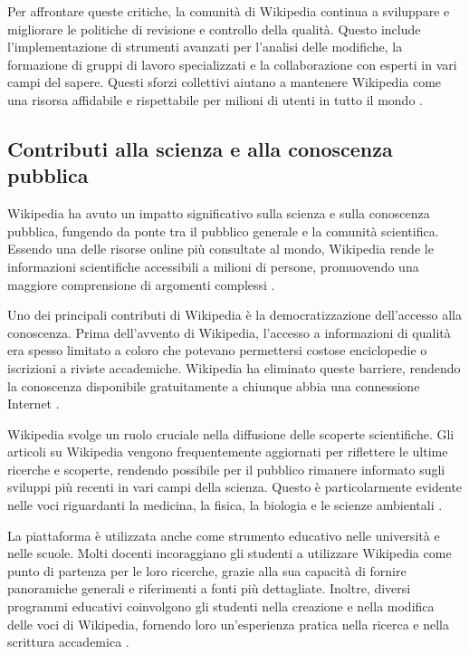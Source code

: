 \documentclass[12pt,a4paper]{report}
\begin{document}
Per affrontare queste critiche, la comunità di Wikipedia continua a sviluppare e migliorare le politiche di revisione e controllo della qualità. Questo include l'implementazione di strumenti avanzati per l'analisi delle modifiche, la formazione di gruppi di lavoro specializzati e la collaborazione con esperti in vari campi del sapere. Questi sforzi collettivi aiutano a mantenere Wikipedia come una risorsa affidabile e rispettabile per milioni di utenti in tutto il mondo \cite{jemielniak2014wikipedia}.

\subsection{Contributi alla scienza e alla conoscenza pubblica}

Wikipedia ha avuto un impatto significativo sulla scienza e sulla conoscenza pubblica, fungendo da ponte tra il pubblico generale e la comunità scientifica. Essendo una delle risorse online più consultate al mondo, Wikipedia rende le informazioni scientifiche accessibili a milioni di persone, promuovendo una maggiore comprensione di argomenti complessi \cite{reagle2010good}.

Uno dei principali contributi di Wikipedia è la democratizzazione dell'accesso alla conoscenza. Prima dell'avvento di Wikipedia, l'accesso a informazioni di qualità era spesso limitato a coloro che potevano permettersi costose enciclopedie o iscrizioni a riviste accademiche. Wikipedia ha eliminato queste barriere, rendendo la conoscenza disponibile gratuitamente a chiunque abbia una connessione Internet \cite{lih2009wikipedia}.

Wikipedia svolge un ruolo cruciale nella diffusione delle scoperte scientifiche. Gli articoli su Wikipedia vengono frequentemente aggiornati per riflettere le ultime ricerche e scoperte, rendendo possibile per il pubblico rimanere informato sugli sviluppi più recenti in vari campi della scienza. Questo è particolarmente evidente nelle voci riguardanti la medicina, la fisica, la biologia e le scienze ambientali \cite{jemielniak2014wikipedia}.

La piattaforma è utilizzata anche come strumento educativo nelle università e nelle scuole. Molti docenti incoraggiano gli studenti a utilizzare Wikipedia come punto di partenza per le loro ricerche, grazie alla sua capacità di fornire panoramiche generali e riferimenti a fonti più dettagliate. Inoltre, diversi programmi educativi coinvolgono gli studenti nella creazione e nella modifica delle voci di Wikipedia, fornendo loro un'esperienza pratica nella ricerca e nella scrittura accademica \cite{denning2005wikipedia}.
\end{document}
